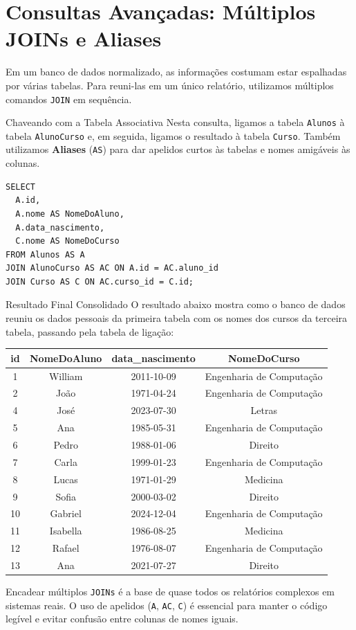 \documentclass[12pt]{article}
\begin{document}
\section{Consultas Avançadas: Múltiplos JOINs e Aliases}

Em um banco de dados normalizado, as informações costumam estar espalhadas por várias tabelas. Para reuni-las em um único relatório, utilizamos múltiplos comandos \texttt{JOIN} em sequência.

\begin{block}{Chaveando com a Tabela Associativa}
Nesta consulta, ligamos a tabela \texttt{Alunos} à tabela \texttt{AlunoCurso} e, em seguida, ligamos o resultado à tabela \texttt{Curso}. Também utilizamos \textbf{Aliases} (\texttt{AS}) para dar apelidos curtos às tabelas e nomes amigáveis às colunas.

\begin{lstlisting}
SELECT
  A.id,
  A.nome AS NomeDoAluno,
  A.data_nascimento,
  C.nome AS NomeDoCurso
FROM Alunos AS A
JOIN AlunoCurso AS AC ON A.id = AC.aluno_id
JOIN Curso AS C ON AC.curso_id = C.id;
\end{lstlisting}
\end{block}

\begin{block}{Resultado Final Consolidado}
O resultado abaixo mostra como o banco de dados reuniu os dados pessoais da primeira tabela com os nomes dos cursos da terceira tabela, passando pela tabela de ligação:

\begin{center}
{\tiny
\begin{longtable}{cccc}
\toprule
\textbf{id} & \textbf{NomeDoAluno} & \textbf{data\_nascimento} & \textbf{NomeDoCurso} \\
\midrule
1  & William  & 2011-10-09 & Engenharia de Computação \\
2  & João     & 1971-04-24 & Engenharia de Computação \\
4  & José     & 2023-07-30 & Letras \\
5  & Ana      & 1985-05-31 & Engenharia de Computação \\
6  & Pedro    & 1988-01-06 & Direito \\
7  & Carla    & 1999-01-23 & Engenharia de Computação \\
8  & Lucas    & 1971-01-29 & Medicina \\
9  & Sofia    & 2000-03-02 & Direito \\
10 & Gabriel  & 2024-12-04 & Engenharia de Computação \\
11 & Isabella & 1986-08-25 & Medicina \\
12 & Rafael   & 1976-08-07 & Engenharia de Computação \\
13 & Ana      & 2021-07-27 & Direito \\
\bottomrule
\end{longtable}
}
\end{center}
\end{block}

\begin{dica}
Encadear múltiplos \texttt{JOINs} é a base de quase todos os relatórios complexos em sistemas reais. O uso de apelidos (\texttt{A}, \texttt{AC}, \texttt{C}) é essencial para manter o código legível e evitar confusão entre colunas de nomes iguais.
\end{dica}
\end{document}
